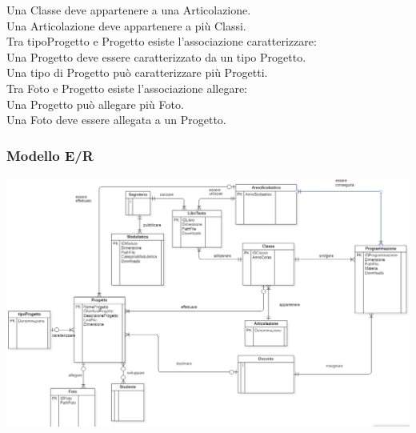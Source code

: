 \documentclass{article}
\begin{document}
	Una Classe deve appartenere a una Articolazione.\\
	Una Articolazione deve appartenere a più Classi.\\
	\vspace{2mm}
	Tra tipoProgetto e Progetto esiste l’associazione caratterizzare:\\
	Una Progetto deve essere caratterizzato da un tipo Progetto.\\
	Una tipo di Progetto può caratterizzare più Progetti.\\
	\vspace{2mm}
	Tra Foto e Progetto esiste l’associazione allegare:\\
	Una Progetto può allegare più Foto.\\
	Una Foto deve essere allegata a un Progetto.\\
	\subsubsection{\textbf{Modello E/R}}
	\includegraphics[scale=0.4]{modelloer.png}
\end{document}
